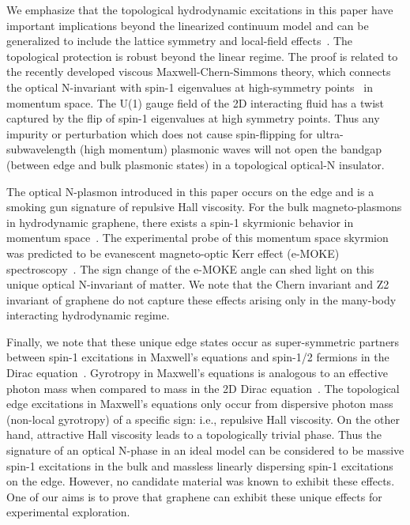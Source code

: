\documentclass[%
reprint,
amsmath,amssymb,
aps,superscriptaddress
]{revtex4-2}
\begin{document}
We emphasize that the topological hydrodynamic excitations in this paper have important implications beyond the linearized continuum model and can be generalized to include the lattice symmetry and local-field effects~\cite{van2022optical}. The topological protection is robust beyond the linear regime. The proof is related to the recently developed viscous Maxwell-Chern-Simmons theory, which connects the optical N-invariant with spin-1 eigenvalues at high-symmetry points~\cite{van2020viscous} in momentum space. The U(1) gauge field of the 2D interacting fluid has a twist captured by the flip of spin-1 eigenvalues at high symmetry points. Thus any impurity or perturbation which does not cause spin-flipping for ultra-subwavelength (high momentum) plasmonic waves will not open the bandgap (between edge and bulk plasmonic states) in a topological optical-N insulator. 

The optical N-plasmon introduced in this paper occurs on the edge and is a smoking gun signature of repulsive Hall viscosity. For the bulk magneto-plasmons in hydrodynamic graphene, there exists a spin-1 skyrmionic behavior in momentum space~\cite{van2019photonic}. The experimental probe of this momentum space skyrmion was predicted to be evanescent magneto-optic Kerr effect (e-MOKE) spectroscopy~\cite{van2021optical}. The sign change of the e-MOKE angle can shed light on this unique optical N-invariant of matter. We note that the Chern invariant and Z2 invariant of graphene do not capture these effects arising only in the many-body interacting hydrodynamic regime.

Finally, we note that these unique edge states occur as super-symmetric partners between spin-1 excitations in Maxwell's equations and spin-1/2 fermions in the Dirac equation~\cite{van2018quantum}. Gyrotropy in Maxwell's equations is analogous to an effective photon mass when compared to mass in the 2D Dirac equation~\cite{van2020viscous,van2019unidirectional}. The topological edge excitations in Maxwell's equations only occur from dispersive photon mass (non-local gyrotropy) of a specific sign: i.e., repulsive Hall viscosity. On the other hand, attractive Hall viscosity leads to a topologically trivial phase. Thus the signature of an optical N-phase in an ideal model can be considered to be massive spin-1 excitations in the bulk and massless linearly dispersing spin-1 excitations on the edge.  However, no candidate material was known to exhibit these effects. One of our aims is to prove that graphene can exhibit these unique effects for experimental exploration.
\end{document}
